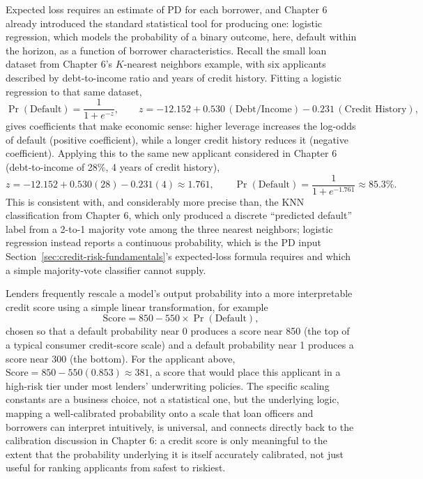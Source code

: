 \documentclass[../ai_in_finance]{subfiles}
\begin{document}
Expected loss requires an estimate of PD for each borrower, and Chapter 6 already introduced the standard statistical tool for producing one: logistic regression, which models the probability of a binary outcome, here, default within the horizon, as a function of borrower characteristics. Recall the small loan dataset from Chapter 6's $K$-nearest neighbors example, with six applicants described by debt-to-income ratio and years of credit history. Fitting a logistic regression to that same dataset,
\begin{equation*}
\Pr(\text{Default}) = \frac{1}{1+e^{-z}}, \qquad z = -12.152 + 0.530\,(\text{Debt/Income}) - 0.231\,(\text{Credit History}),
\end{equation*}
gives coefficients that make economic sense: higher leverage increases the log-odds of default (positive coefficient), while a longer credit history reduces it (negative coefficient). Applying this to the same new applicant considered in Chapter 6 (debt-to-income of 28\%, 4 years of credit history),
\begin{equation*}
z = -12.152 + 0.530(28) - 0.231(4) \approx 1.761, \qquad \Pr(\text{Default}) = \frac{1}{1+e^{-1.761}} \approx 85.3\%.
\end{equation*}
This is consistent with, and considerably more precise than, the KNN classification from Chapter 6, which only produced a discrete ``predicted default'' label from a 2-to-1 majority vote among the three nearest neighbors; logistic regression instead reports a continuous probability, which is the PD input Section~\ref{sec:credit-risk-fundamentals}'s expected-loss formula requires and which a simple majority-vote classifier cannot supply.

Lenders frequently rescale a model's output probability into a more interpretable credit score using a simple linear transformation, for example
\begin{equation*}
\text{Score} = 850 - 550 \times \Pr(\text{Default}),
\end{equation*}
chosen so that a default probability near 0 produces a score near 850 (the top of a typical consumer credit-score scale) and a default probability near 1 produces a score near 300 (the bottom). For the applicant above, $\text{Score} = 850 - 550(0.853) \approx 381$, a score that would place this applicant in a high-risk tier under most lenders' underwriting policies.
The specific scaling constants are a business choice, not a statistical one, but the underlying logic, mapping a well-calibrated probability onto a scale that loan officers and borrowers can interpret intuitively, is universal, and connects directly back to the calibration discussion in Chapter 6: a credit score is only meaningful to the extent that the probability underlying it is itself accurately calibrated, not just useful for ranking applicants from safest to riskiest.
\end{document}
